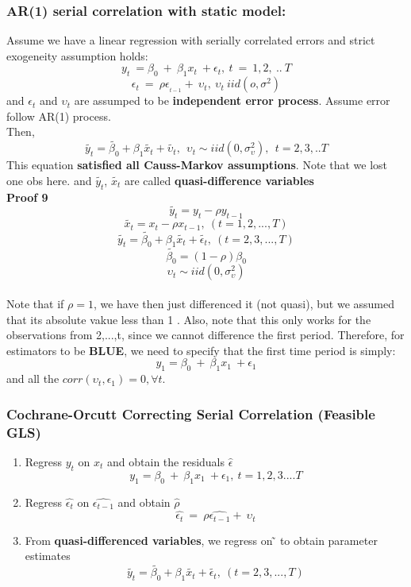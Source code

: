 \documentclass[12pt]{article}
\begin{document}
{\color{RoyalBlue}
\subsubsection{AR(1) serial correlation with static model:}}
Assume we have a linear regression with serially correlated errors and strict exogeneity assumption holds:
$$y_t\ =\beta_0\ +\ \beta_1x_t\ +\epsilon_t,\ t\ =\ 1,2,\ ..\ T$$
$$\epsilon_t\ =\ \rho\epsilon_{_{t-1}}+\ \upsilon_t, \ \upsilon_t \ iid(o,\sigma^2)$$
and $\epsilon_t $ and $\upsilon_t$ are assumped to be \textbf{independent error process}. Assume error follow AR(1) process. 
\\
Then,
\begin{equation}
\tilde{y_t} = \tilde{\beta_0}+ \beta_1 \tilde{x_t} + \tilde{\upsilon_t}, \ \  \upsilon_t \sim iid\left(0,\sigma_{\upsilon}^2\right),\ \ t = 2,3,..T 
\end{equation}
This equation \textbf{satisfied all Causs-Markov assumptions}. Note that we lost one obs here. and $\tilde{y_t}$, $\tilde{x_t}$ are called \textbf{quasi-difference variables} 
\\

\noindent
{\color{Tan} \textbf{Proof 9}}\\
$$\tilde{y_t} = y_t - \rho y_{t-1} $$ $$\tilde{x_t} = x_t - \rho x_{t-1} ,\ (t = 1,2 ,...,T)$$
$$\tilde{y_t} = \tilde{\beta_0} + \beta_1 \tilde{x_t} + \tilde{\epsilon_t} , \ (t = 2,3,...,T)$$
$$\tilde{\beta_0} = (1-\rho) \beta_0$$
$$\upsilon_t \sim iid\left(0,\sigma_{\upsilon}^2\right) $$
\\

Note that if $\rho = 1 $, we have then just differenced it (not quasi), but we assumed that its absolute vakue less than 1 . Also, note that this only works for the observations from 2,...,t, since we cannot difference the first period. Therefore, for estimators to be \textbf{BLUE}, we need to specify that the first time period is simply:
$$y_1=\beta_0\ +\ \beta_1x_1\ +\epsilon_1$$
and all the $ corr(\upsilon_t, \epsilon_1) = 0, \forall t $. 
\\



{\color{RoyalBlue}
\subsubsection{Cochrane-Orcutt Correcting Serial Correlation (Feasible GLS)}}
\begin{enumerate}
\item
Regress $y_t$ on $x_t$ and obtain the residuals $\hat{\epsilon}$
$$y_1=\beta_0\ +\ \beta_1x_1\ +\epsilon_1, \ t = 1,2,3....T$$
\item
Regress $\hat{\epsilon_t}$ on $\hat{\epsilon_{t-1}}$ and obtain $\hat{\rho}$
$$\hat{\epsilon_t}\ =\ \rho \hat{\epsilon_{t-1}}+\ \upsilon_t $$
\item
From \textbf{quasi-differenced variables}, we regress  on ̃ to obtain parameter estimates
$$ \tilde{y_t} = \tilde{\beta_0} + \beta_1 \tilde{x_t} + \tilde{\epsilon_t} , \ (t = 2,3,...,T) $$
\end{enumerate}
\end{document}
